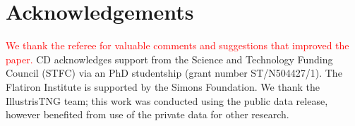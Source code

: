 \documentclass[fleqn,usenatbib]{mnras}
\newcommand{\red}[1]{{\textcolor{red}{#1}}}
\begin{document}

\section*{Acknowledgements}
\red{We thank the referee for valuable comments and suggestions that improved the paper.} CD acknowledges support from the Science and Technology Funding Council (STFC) via an PhD studentship (grant number ST/N504427/1). The Flatiron Institute is supported by the Simons Foundation. We thank the IllustrisTNG team; this work was conducted using the public data release, however benefited from use of the private data for other research. 




 

\label{lastpage}
\bsp	%
\end{document}
